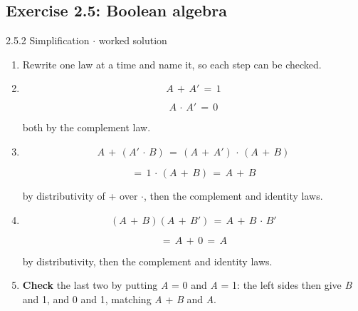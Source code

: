 \documentclass[11pt]{article}
\begin{document}
\begin{keepsection}\subsection{Exercise 2.5: Boolean algebra}

\begin{workedbox}{2.5.2 Simplification \ensuremath{\cdot} worked solution}
\begin{enumerate}
\item Rewrite one law at a time and name it, so each step can be checked.
\item {}
\begin{equation*}{A}\, +\, {A}'\, =\, 1\end{equation*}

\begin{equation*}{A}\, \cdot \, {A}'\, =\, 0\end{equation*}

both by the complement law.
\item {}
\begin{equation*}{A}\, +\, ({A}'\, \cdot \, {B})\, =\, ({A}\, +\, {A}')\, \cdot \, ({A}\, +\, {B})\end{equation*}

\begin{equation*}=\, 1\, \cdot \, ({A}\, +\, {B})\, =\, {A}\, +\, {B}\end{equation*}

by distributivity of + over \ensuremath{\cdot}, then the complement and identity laws.
\item {}
\begin{equation*}({A}\, +\, {B})({A}\, +\, {B}')\, =\, {A}\, +\, {B}\, \cdot \, {B}'\end{equation*}

\begin{equation*}=\, {A}\, +\, 0\, =\, {A}\end{equation*}

by distributivity, then the complement and identity laws.
\item \textbf{Check} the last two by putting \textit{A} = 0 and \textit{A} = 1: the left sides then give \textit{B} and 1, and 0 and 1, matching \textit{A} + \textit{B} and \textit{A}.
\end{enumerate}
\end{workedbox}

\end{keepsection}
\end{document}
